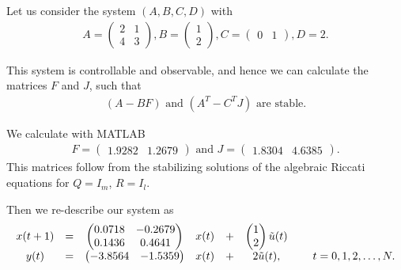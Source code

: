 \begin{example}
	\label{ex:ILC:LQR}
Let us consider the system $(A,B,C,D)$ with 
\begin{align}
\label{eq:ILC:Sys_ex1_origin}
A = \begin{pmatrix}
2 & 1 \\  4 & 3
\end{pmatrix}, B = \begin{pmatrix}
1 \\ 2
\end{pmatrix}, C = \begin{pmatrix}
0 & 1
\end{pmatrix}, D = 2.
\end{align}

This system is controllable and observable, and hence we can calculate the matrices $F$ and $J$, such that 
\begin{align}
(A - BF) \text{ and } (A^T - C^T J) \text{ are stable}. 
\end{align}

We calculate with MATLAB 
\begin{align}
F =\begin{pmatrix}
 1.9282   & 1.2679
\end{pmatrix} \text{ and } 
J = \begin{pmatrix}
1.8304  &  4.6385
\end{pmatrix}. 
\end{align}
This matrices follow from the stabilizing solutions of the algebraic Riccati equations for $Q = I_m$, $R = I_l$. 

Then we re-describe our system as
\begin{align}
\label{eq:ILC:Sys_ex1}
\begin{array}{c c c c c c c c c}
x(t+1) &=&
\begin{pmatrix}
0.0718  & -0.2679\\
0.1436  &  0.4641
\end{pmatrix}
& x(t) &+& 
\begin{pmatrix}
1 \\ 2
\end{pmatrix}
\tilde{u}(t)& &
\\ 
y(t)   &=& \begin{pmatrix}
	-3.8564 &   -1.5359
\end{pmatrix}
& x(t)& +&
 2 \tilde{u} (t),& &\; t = 0, 1, 2, \dots, N. 
\end{array}
\end{align} 





\end{example}
